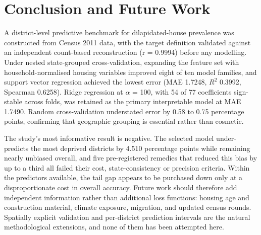 \documentclass[conference]{IEEEtran}
\begin{document}
\section{Conclusion and Future Work}

A district-level predictive benchmark for dilapidated-house prevalence was constructed from Census 2011 data, with the target definition validated against an independent count-based reconstruction (r = 0.9994) before any modelling. Under nested state-grouped cross-validation, expanding the feature set with household-normalised housing variables improved eight of ten model families, and support vector regression achieved the lowest error (MAE 1.7248, $R^2$ 0.3992, Spearman 0.6258). Ridge regression at $\alpha$ = 100, with 54 of 77 coefficients sign-stable across folds, was retained as the primary interpretable model at MAE 1.7490. Random cross-validation understated error by 0.58 to 0.75 percentage points, confirming that geographic grouping is essential rather than cosmetic.

The study's most informative result is negative. The selected model under-predicts the most deprived districts by 4.510 percentage points while remaining nearly unbiased overall, and five pre-registered remedies that reduced this bias by up to a third all failed their cost, state-consistency or precision criteria. Within the predictors available, the tail gap appears to be purchased down only at a disproportionate cost in overall accuracy. Future work should therefore add independent information rather than additional loss functions: housing age and construction material, climate exposure, migration, and updated census rounds. Spatially explicit validation and per-district prediction intervals are the natural methodological extensions, and none of them has been attempted here.
\end{document}
